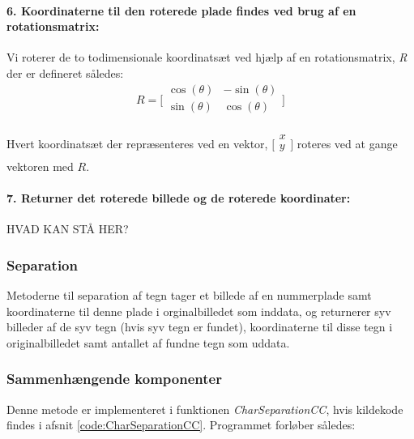 \paragraph{6. Koordinaterne til den roterede plade findes ved brug af en rotationsmatrix:} Vi roterer de to todimensionale koordinatsæt ved hjælp af en rotationsmatrix, \textit{R} der er defineret således:
\begin{displaymath} 
R = 
\biggl[ \begin{array}{cc} 
\cos(\theta) & - \sin(\theta) \\
\sin(\theta) & \cos(\theta) \\
\end{array} \biggr] 
\end{displaymath}

Hvert koordinatsæt der repræsenteres ved en vektor, $\biggl[\begin{array}{c} x\\ y\\ \end{array}\biggr]$ roteres ved at gange vektoren med $R$.

\paragraph{7. Returner det roterede billede og de roterede koordinater:} HVAD KAN STÅ HER?

\subsubsection{Separation}

Metoderne til separation af tegn tager et billede af en nummerplade samt koordinaterne til denne plade i orginalbilledet som inddata, og returnerer syv billeder af de syv tegn (hvis syv tegn er fundet), koordinaterne til disse tegn i originalbilledet samt antallet af fundne tegn som uddata.

\subsubsection*{Sammenhængende komponenter}

Denne metode er implementeret i funktionen \textit{CharSeparationCC}, hvis kildekode findes i afsnit \vref{code:CharSeparationCC}. Programmet forløber således:

